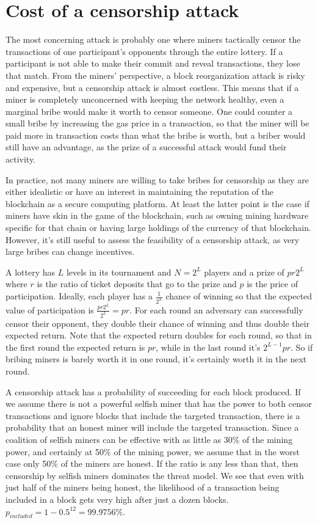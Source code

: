 \section{Cost of a censorship attack}
\label{sec:censorship}
The most concerning attack is probably one where miners tactically censor the transactions of one participant's opponents through the entire lottery. If a participant is not able to make their commit and reveal transactions, they lose that match. From the miners' perspective, a block reorganization attack is risky and expensive, but a censorship attack is almost costless. This means that if a miner is completely unconcerned with keeping the network healthy, even a marginal bribe would make it worth to censor someone. One could counter a small bribe by increasing the gas price in a transaction, so that the miner will be paid more in transaction costs than what the bribe is worth, but a briber would still have an advantage, as the prize of a successful attack would fund their activity. 

In practice, not many miners are willing to take bribes for censorship as they are either idealistic or have an interest in maintaining the reputation of the blockchain as a secure computing platform. At least the latter point is the case if miners have skin in the game of the blockchain, such as owning mining hardware specific for that chain or having large holdings of the currency of that blockchain. However, it's still useful to assess the feasibility of a censorship attack, as very large bribes can change incentives.

A lottery has $L$ levels in its tournament and $N=2^L$ players and a prize of $pr2^L$ where $r$ is the ratio of ticket deposits that go to the prize and $p$ is the price of participation. Ideally, each player has a $\frac{1}{2^L}$ chance of winning so that the expected value of participation is $\frac{pr2^L}{2^L}=pr$. For each round an adversary can successfully censor their opponent, they double their chance of winning and thus double their expected return. Note that the expected return doubles for each round, so that in the first round the expected return is $pr$, while in the last round it's $2^{L-1}pr$. So if bribing miners is barely worth it in one round, it's certainly worth it in the next round.

A censorship attack has a probability of succeeding for each block produced. If we assume there is not a powerful selfish miner that has the power to both censor transactions and ignore blocks that include the targeted transaction, there is a probability that an honest miner will include the targeted transaction. Since a coalition of selfish miners can be effective with as little as 30\% of the mining power, and certainly at 50\% of the mining power, we assume that in the worst case only 50\% of the miners are honest. If the ratio is any less than that, then censorship by selfish miners dominates the threat model. We see that even with just half of the miners being honest, the likelihood of a transaction being included in a block gets very high after just a dozen blocks. $p_{included} = 1-0.5^{12}=99.9756\%$.

